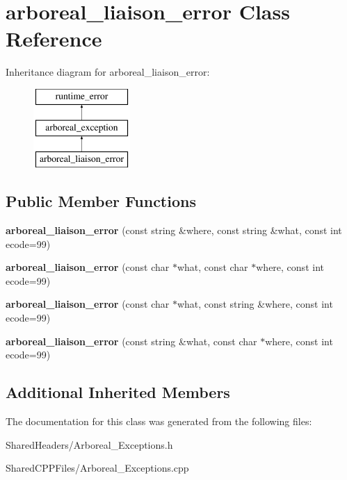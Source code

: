 \hypertarget{classarboreal__liaison__error}{}\section{arboreal\+\_\+liaison\+\_\+error Class Reference}
\label{classarboreal__liaison__error}
Inheritance diagram for arboreal\+\_\+liaison\+\_\+error\+:\begin{figure}[H]
\begin{center}
\leavevmode
\includegraphics[height=3.000000cm]{classarboreal__liaison__error}
\end{center}
\end{figure}
\subsection*{Public Member Functions}
\begin{DoxyCompactItemize}
\item 
{\bfseries arboreal\+\_\+liaison\+\_\+error} (const string \&where, const string \&what, const int ecode=99)\hypertarget{classarboreal__liaison__error_af23c4a3672c9594e3382a05a1590abc4}{}\label{classarboreal__liaison__error_af23c4a3672c9594e3382a05a1590abc4}

\item 
{\bfseries arboreal\+\_\+liaison\+\_\+error} (const char $\ast$what, const char $\ast$where, const int ecode=99)\hypertarget{classarboreal__liaison__error_ae9eaf00df34e37262348e254c6dad5ff}{}\label{classarboreal__liaison__error_ae9eaf00df34e37262348e254c6dad5ff}

\item 
{\bfseries arboreal\+\_\+liaison\+\_\+error} (const char $\ast$what, const string \&where, const int ecode=99)\hypertarget{classarboreal__liaison__error_a593436824d649179f5c34b7311c56d2e}{}\label{classarboreal__liaison__error_a593436824d649179f5c34b7311c56d2e}

\item 
{\bfseries arboreal\+\_\+liaison\+\_\+error} (const string \&what, const char $\ast$where, const int ecode=99)\hypertarget{classarboreal__liaison__error_a73221c813d25af214f19eaec704ffffd}{}\label{classarboreal__liaison__error_a73221c813d25af214f19eaec704ffffd}

\end{DoxyCompactItemize}
\subsection*{Additional Inherited Members}


The documentation for this class was generated from the following files\+:\begin{DoxyCompactItemize}
\item 
Shared\+Headers/Arboreal\+\_\+\+Exceptions.\+h\item 
Shared\+C\+P\+P\+Files/Arboreal\+\_\+\+Exceptions.\+cpp\end{DoxyCompactItemize}
